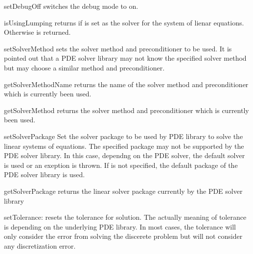\begin{methoddesc}[LinearPDE]{setDebugOff}{}
switches the debug mode to on.
\end{methoddesc}

\begin{methoddesc}[LinearPDE]{isUsingLumping}{}
returns \True if \LUMPING is set as the solver for the system of lienar equations.
Otherwise \False is returned.
\end{methoddesc}

\begin{methoddesc}[LinearPDE]{setSolverMethod}{}
sets the solver method and preconditioner to be used. It is pointed out that a PDE solver library
may not know the specified solver method but may choose a similar method and preconditioner. 
\end{methoddesc}

\begin{methoddesc}[LinearPDE]{getSolverMethodName}{}
returns the name of the solver method and preconditioner which is currently been used.
\end{methoddesc}

\begin{methoddesc}[LinearPDE]{getSolverMethod}{}
returns the solver method and preconditioner which is currently been used.
\end{methoddesc}

\begin{methoddesc}[LinearPDE]{setSolverPackage}{}
Set the solver package to be used by PDE library to solve the linear systems of equations. The 
specified package may not be supported by the PDE solver library. In this case, dependng on
the PDE solver, the default solver is used or an exeption is thrown.
If  is not specified, the default package of the PDE solver library is used. 
\end{methoddesc}

\begin{methoddesc}[LinearPDE]{getSolverPackage}{}
returns the linear solver package currently by the PDE solver library
\end{methoddesc}


\begin{methoddesc}[LinearPDE]{setTolerance}{}:
resets the tolerance for solution. The actually meaning of tolerance is
depending on the underlying PDE library. In most cases, the tolerance 
will only consider the error from solving the discerete problem but will
not consider any discretization error.
\end{methoddesc}

